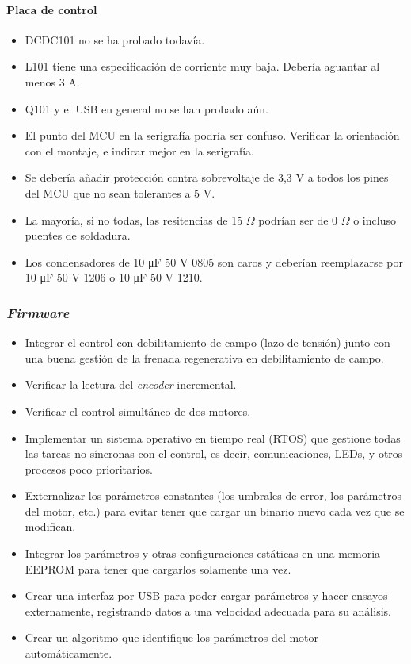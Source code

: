 \paragraph{Placa de control}
\begin{itemize}
	\item DCDC101 no se ha probado todavía.
	\item L101 tiene una especificación de corriente muy baja. Debería aguantar al menos 3 A.
	\item Q101 y el USB en general no se han probado aún.
	\item El punto del MCU en la serigrafía podría ser confuso. Verificar la orientación con el montaje, e indicar mejor en la serigrafía.
	\item Se debería añadir protección contra sobrevoltaje de 3,3 V a todos los pines del MCU que no sean tolerantes a 5 V.
	\item La mayoría, si no todas, las resitencias de 15 $\Omega$ podrían ser de 0 $\Omega$ o incluso puentes de soldadura.
	\item Los condensadores de 10 \unit{\micro\farad} 50 V 0805 son caros y deberían reemplazarse por 10 \unit{\micro\farad} 50 V 1206 o 10 \unit{\micro\farad} 50 V 1210.
\end{itemize}

\subsubsection{\textit{Firmware}}

\begin{itemize}
	\item Integrar el control con debilitamiento de campo (lazo de tensión) junto con una buena gestión de la frenada regenerativa en debilitamiento de campo.
	\item Verificar la lectura del \textit{encoder} incremental.
	\item Verificar el control simultáneo de dos motores.
	\item Implementar un sistema operativo en tiempo real (RTOS) que gestione todas las tareas no síncronas con el control, es decir, comunicaciones, LEDs, y otros procesos poco prioritarios.
	\item Externalizar los parámetros constantes (los umbrales de error, los parámetros del motor, etc.) para evitar tener que cargar un binario nuevo cada vez que se modifican.
	\item Integrar los parámetros y otras configuraciones estáticas en una memoria EEPROM para tener que cargarlos solamente una vez.
	\item Crear una interfaz por USB para poder cargar parámetros y hacer ensayos externamente, registrando datos a una velocidad adecuada para su análisis.
	\item Crear un algoritmo que identifique los parámetros del motor automáticamente.
\end{itemize}